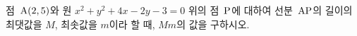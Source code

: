 점~$\mathrm{A}(2{,}\mkern3mu\mathopen{}5)$와 원 $x^2+y^2+4x-2y-3=0$ 위의 점~$\mathrm{P}$에 대하여 선분~$\mathrm{AP}$의 길이의 최댓값을 $M$, 최솟값을 $m$이라 할 때, $Mm$의 값을 구하시오.
